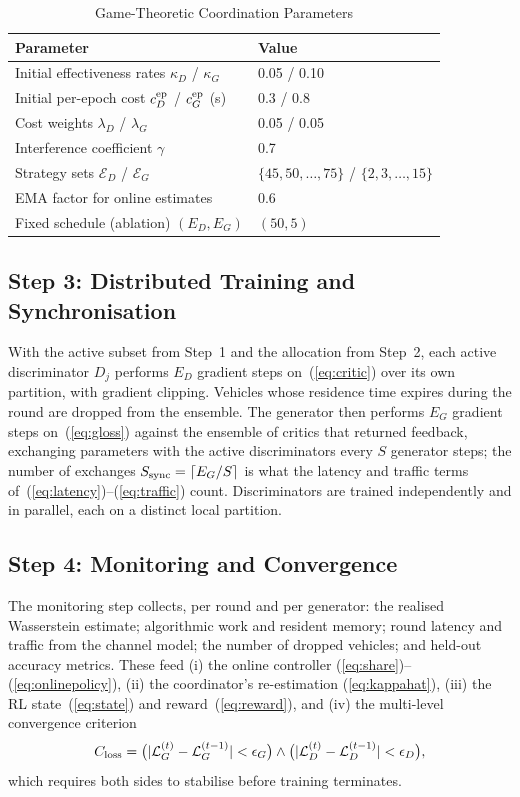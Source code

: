 \documentclass[journal]{IEEEtran}
\begin{document}
\begin{table}[!t]
\centering
\caption{Game-Theoretic Coordination Parameters}
\label{tab:game}
\footnotesize
\begin{tabular}{ll}
\toprule
Parameter & Value \\
\midrule
Initial effectiveness rates $\kappa_D$ / $\kappa_G$ & 0.05 / 0.10 \\
Initial per-epoch cost $c^{\rm ep}_D$ / $c^{\rm ep}_G$ (s) & 0.3 / 0.8 \\
Cost weights $\lambda_D$ / $\lambda_G$ & 0.05 / 0.05 \\
Interference coefficient $\gamma$ & 0.7 \\
Strategy sets $\mathcal{E}_D$ / $\mathcal{E}_G$ & $\{45,50,\ldots,75\}$ / $\{2,3,\ldots,15\}$ \\
EMA factor for online estimates & 0.6 \\
Fixed schedule (ablation) $(E_D,E_G)$ & $(50,5)$ \\
\bottomrule
\end{tabular}
\end{table}

\subsection{Step 3: Distributed Training and Synchronisation}
\label{sec:step3}
With the active subset from Step~1 and the allocation from Step~2, each active
discriminator $D_j$ performs $E_D$ gradient steps on~(\ref{eq:critic}) over its
own partition, with gradient clipping. Vehicles whose residence time expires
during the round are dropped from the ensemble. The generator then performs
$E_G$ gradient steps on~(\ref{eq:gloss}) against the ensemble of critics that
returned feedback, exchanging parameters with the active discriminators every
$S$ generator steps; the number of exchanges $S_{\rm sync}=\lceil E_G/S\rceil$
is what the latency and traffic terms of~(\ref{eq:latency})--(\ref{eq:traffic})
count. Discriminators are trained independently and in parallel, each on a
distinct local partition.

\subsection{Step 4: Monitoring and Convergence}
\label{sec:step4}
The monitoring step collects, per round and per generator: the realised
Wasserstein estimate; algorithmic work and resident memory; round latency and
traffic from the channel model; the number of dropped vehicles; and held-out
accuracy metrics. These feed (i) the online controller
(\ref{eq:share})--(\ref{eq:onlinepolicy}), (ii) the coordinator's re-estimation
(\ref{eq:kappahat}), (iii) the RL state~(\ref{eq:state}) and
reward~(\ref{eq:reward}), and (iv) the multi-level convergence criterion
\begin{equation}
C_{\rm loss}=\big(|\mathcal{L}^{(t)}_G-\mathcal{L}^{(t-1)}_G|<\epsilon_G\big)
 \wedge\big(|\mathcal{L}^{(t)}_D-\mathcal{L}^{(t-1)}_D|<\epsilon_D\big),
\label{eq:conv}
\end{equation}
which requires both sides to stabilise before training terminates.
\end{document}
